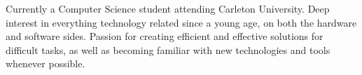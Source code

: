 

\begin{cvparagraph}

Currently a Computer Science student attending Carleton University. Deep interest in everything technology related since a young age, on both the hardware and software sides. Passion for creating efficient and effective solutions for difficult tasks, as well as becoming familiar with new technologies and tools whenever possible.
\end{cvparagraph}
